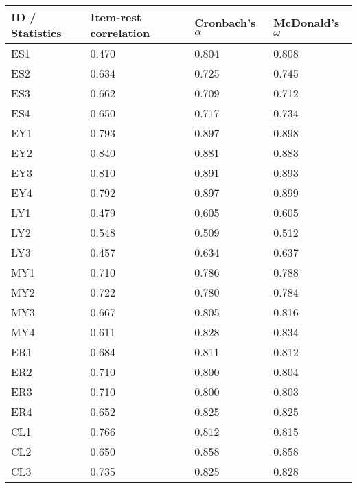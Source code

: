 \documentclass[preprint,12pt]{elsarticle}
\begin{document}
\begin{table}[]
\begin{tabular}{|l|l|l|l|}
\hline
\textbf{ID} / \textbf{Statistics}  & \textbf{Item-rest correlation} & \textbf{Cronbach's $\alpha$} & \textbf{McDonald's $\omega$} \\ \hline
ES1 & 0.470                 & 0.804        & 0.808        \\ \hline
ES2 & 0.634                 & 0.725        & 0.745        \\ \hline
ES3 & 0.662                 & 0.709        & 0.712        \\ \hline
ES4 & 0.650                 & 0.717        & 0.734        \\ \hline
EY1 & 0.793                 & 0.897        & 0.898        \\ \hline
EY2 & 0.840                 & 0.881        & 0.883        \\ \hline
EY3 & 0.810                 & 0.891        & 0.893        \\ \hline
EY4 & 0.792                 & 0.897        & 0.899        \\ \hline
LY1 & 0.479                 & 0.605        & 0.605        \\ \hline
LY2 & 0.548                 & 0.509        & 0.512        \\ \hline
LY3 & 0.457                 & 0.634        & 0.637        \\ \hline
MY1 & 0.710                 & 0.786        & 0.788        \\ \hline
MY2 & 0.722                 & 0.780        & 0.784        \\ \hline
MY3 & 0.667                 & 0.805        & 0.816        \\ \hline
MY4 & 0.611                 & 0.828        & 0.834        \\ \hline
ER1 & 0.684                 & 0.811        & 0.812        \\ \hline
ER2 & 0.710                 & 0.800        & 0.804        \\ \hline
ER3 & 0.710                 & 0.800        & 0.803        \\ \hline
ER4 & 0.652                 & 0.825        & 0.825        \\ \hline
CL1 & 0.766                 & 0.812        & 0.815        \\ \hline
CL2 & 0.650                 & 0.858        & 0.858        \\ \hline
CL3 & 0.735                 & 0.825        & 0.828        \\ \hline

\end{tabular}
\end{table}
\end{document}
